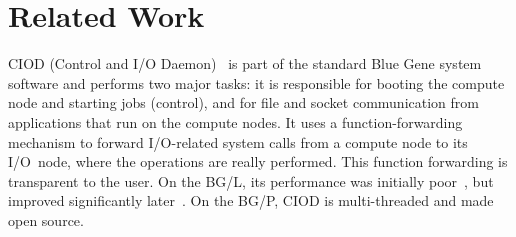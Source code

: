 \documentclass[journal]{IEEEtran}
\begin{document}



\section{Related Work}
\label{sec:related-work}

CIOD (Control and I/O Daemon)~\cite{IBM:08} is part of the standard Blue Gene
system software and performs two major tasks: it is responsible for booting
the compute node and starting jobs (control), and for file and socket
communication from applications that run on the compute nodes.
It uses a function-forwarding mechanism to forward I/O-related system calls
from a compute node to its I/O~node, where the operations are really performed.
This function forwarding is transparent to the user.
On the BG/L, its performance was initially poor~\cite{Romein:06}, but
improved significantly later~\cite{Iskra:08}.
On the BG/P, CIOD is multi-threaded and made open source.
\end{document}
